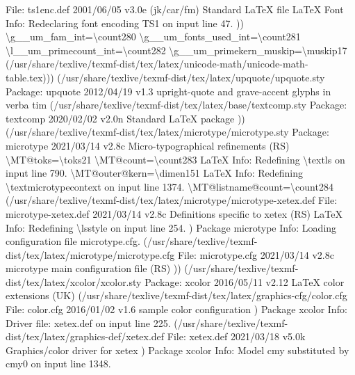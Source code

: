 \documentclass[
  letterpaper,
  DIV=11,
  numbers=noendperiod]{scrartcl}
\newenvironment{Shaded}{\begin{snugshade}}{\end{snugshade}}
\newcommand{\NormalTok}[1]{\textcolor[rgb]{0.00,0.23,0.31}{#1}}
\begin{document}
\begin{Shaded}
\begin{Highlighting}[]
\NormalTok{File: ts1enc.def 2001/06/05 v3.0e (jk/car/fm) Standard LaTeX file}
\NormalTok{LaTeX Font Info:    Redeclaring font encoding TS1 on input line 47.}
\NormalTok{))}
\NormalTok{\textbackslash{}g\_\_um\_fam\_int=\textbackslash{}count280}
\NormalTok{\textbackslash{}g\_\_um\_fonts\_used\_int=\textbackslash{}count281}
\NormalTok{\textbackslash{}l\_\_um\_primecount\_int=\textbackslash{}count282}
\NormalTok{\textbackslash{}g\_\_um\_primekern\_muskip=\textbackslash{}muskip17}
\NormalTok{(/usr/share/texlive/texmf{-}dist/tex/latex/unicode{-}math/unicode{-}math{-}table.tex)))}
\NormalTok{(/usr/share/texlive/texmf{-}dist/tex/latex/upquote/upquote.sty}
\NormalTok{Package: upquote 2012/04/19 v1.3 upright{-}quote and grave{-}accent glyphs in verba}
\NormalTok{tim}
\NormalTok{(/usr/share/texlive/texmf{-}dist/tex/latex/base/textcomp.sty}
\NormalTok{Package: textcomp 2020/02/02 v2.0n Standard LaTeX package}
\NormalTok{)) (/usr/share/texlive/texmf{-}dist/tex/latex/microtype/microtype.sty}
\NormalTok{Package: microtype 2021/03/14 v2.8c Micro{-}typographical refinements (RS)}
\NormalTok{\textbackslash{}MT@toks=\textbackslash{}toks21}
\NormalTok{\textbackslash{}MT@count=\textbackslash{}count283}
\NormalTok{LaTeX Info: Redefining \textbackslash{}textls on input line 790.}
\NormalTok{\textbackslash{}MT@outer@kern=\textbackslash{}dimen151}
\NormalTok{LaTeX Info: Redefining \textbackslash{}textmicrotypecontext on input line 1374.}
\NormalTok{\textbackslash{}MT@listname@count=\textbackslash{}count284}
\NormalTok{(/usr/share/texlive/texmf{-}dist/tex/latex/microtype/microtype{-}xetex.def}
\NormalTok{File: microtype{-}xetex.def 2021/03/14 v2.8c Definitions specific to xetex (RS)}
\NormalTok{LaTeX Info: Redefining \textbackslash{}lsstyle on input line 254.}
\NormalTok{)}
\NormalTok{Package microtype Info: Loading configuration file microtype.cfg.}
\NormalTok{(/usr/share/texlive/texmf{-}dist/tex/latex/microtype/microtype.cfg}
\NormalTok{File: microtype.cfg 2021/03/14 v2.8c microtype main configuration file (RS)}
\NormalTok{)) (/usr/share/texlive/texmf{-}dist/tex/latex/xcolor/xcolor.sty}
\NormalTok{Package: xcolor 2016/05/11 v2.12 LaTeX color extensions (UK)}
\NormalTok{(/usr/share/texlive/texmf{-}dist/tex/latex/graphics{-}cfg/color.cfg}
\NormalTok{File: color.cfg 2016/01/02 v1.6 sample color configuration}
\NormalTok{)}
\NormalTok{Package xcolor Info: Driver file: xetex.def on input line 225.}
\NormalTok{(/usr/share/texlive/texmf{-}dist/tex/latex/graphics{-}def/xetex.def}
\NormalTok{File: xetex.def 2021/03/18 v5.0k Graphics/color driver for xetex}
\NormalTok{)}
\NormalTok{Package xcolor Info: Model \textasciigrave{}cmy\textquotesingle{} substituted by \textasciigrave{}cmy0\textquotesingle{} on input line 1348.}

\end{Highlighting}
\end{Shaded}
\end{document}
